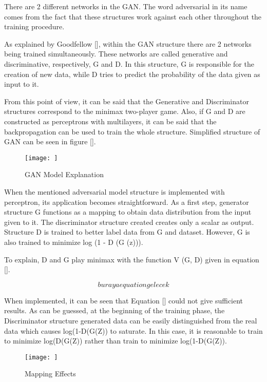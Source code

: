 There are 2 different networks in the GAN. The word adversarial in its name comes from the fact that these structures work against each other throughout the training procedure.

As explained by Goodfellow [], within the GAN structure there are 2 networks being trained simultaneously. These networks are called generative and discriminative, respectively, G and D. In this structure, G is responsible for the creation of new data, while D tries to predict the probability of the data given as input to it.

From this point of view, it can be said that the Generative and Discriminator structures correspond to the minimax two-player game. Also, if G and D are constructed as perceptrons with multilayers, it can be said that the backpropagation can be used to train the whole structure. Simplified structure of GAN can be seen in figure [].

\begin{figure}[h]
    \centering
    \texttt{[image: ]}
    \caption{GAN Model Explanation}
    \label{fig:my_label}
\end{figure}

When the mentioned adversarial model structure is implemented with perceptron, its application becomes straightforward. As a first step, generator structure G functions as a mapping to obtain data distribution from the input given to it. The discriminator structure created creates only a scalar as output. Structure D is trained to better label data from G and dataset. However, G is also trained to minimize log (1 - D (G (z))).

To explain, D and G play minimax with the function V (G, D) given in equation [].

\begin{equation}
    buraya equation gelecek
\end{equation}

When implemented, it can be seen that Equation [] could not give sufficient results. As can be guessed, at the beginning of the training phase, the Discriminator structure generated data can be easily distinguished from the real data which causes log(1-D(G(Z)) to saturate. In this case, it is reasonable to train to minimize log(D(G(Z)) rather than train to minimize log(1-D(G(Z)).

\begin{figure}[h]
    \centering
    \texttt{[image: ]}
    \caption{Mapping Effects}
    \label{fig:my_label}
\end{figure}

